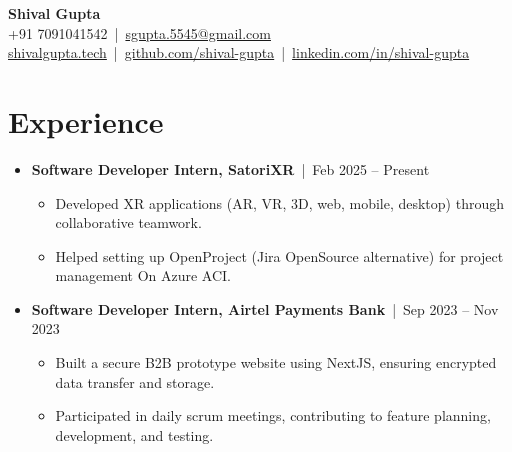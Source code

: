 \documentclass[a4paper,10pt]{article}
\newcommand{\sectionbreak}{\vspace{0.2em}}
\begin{document}
\begin{center}
    {\fontsize{24pt}{28pt}\selectfont \textbf{Shival Gupta}} \\
    \vspace{0.2cm}
    \small +91 7091041542 \,|\, \href{mailto:sgupta.5545@gmail.com}{\textcolor{accentcolor}{sgupta.5545@gmail.com}} \\
    \href{https://shivalgupta.tech/}{\textcolor{accentcolor}{shivalgupta.tech}} \,|\, \href{https://github.com/shival-gupta/}{\textcolor{accentcolor}{github.com/shival-gupta}} \,|\, \href{https://linkedin.com/in/shival-gupta/}{\textcolor{accentcolor}{linkedin.com/in/shival-gupta}}
\end{center}

\vspace{-0.3cm}

\section{Experience}
\begin{itemize}[noitemsep, topsep=0pt]
    \item \textbf{Software Developer Intern, SatoriXR} \,|\, Feb 2025 – Present
        \begin{itemize}
            \item Developed XR applications (AR, VR, 3D, web, mobile, desktop) through collaborative teamwork.
            \item Helped setting up OpenProject (Jira OpenSource alternative) for project management On Azure ACI.
        \end{itemize}
    \item \textbf{Software Developer Intern, Airtel Payments Bank} \,|\, Sep 2023 – Nov 2023
        \begin{itemize}
            \item Built a secure B2B prototype website using NextJS, ensuring encrypted data transfer and storage.
            \item Participated in daily scrum meetings, contributing to feature planning, development, and testing.
        \end{itemize}
\end{itemize}

\sectionbreak

\end{document}
